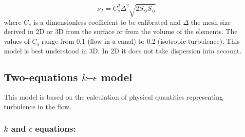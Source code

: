 \begin{equation}
  \nu_T=C_{s}^{2}\Delta^{2}\sqrt{2S_{ij}S_{ij}}%
\end{equation}
where $C_{s}$ is a dimensionless coefficient to be calibrated and $\Delta$ the
mesh size derived in 2D or 3D from the surface or from the volume of the
elements. The values of $C_{s}$ range from 0.1 (flow in a canal) to 0.2
(isotropic turbulence). This model is best understood in 3D. In 2D it does not
take dispersion into account.


\subsection{\label{k-epsilon 3D}Two-equations $k$--$\epsilon$ model%
}

This model is based on the calculation of physical quantities representing
turbulence in the flow.
%
%

\subsubsection{$k$ and $\epsilon$ equations:}\label{sec:kepsequations}

